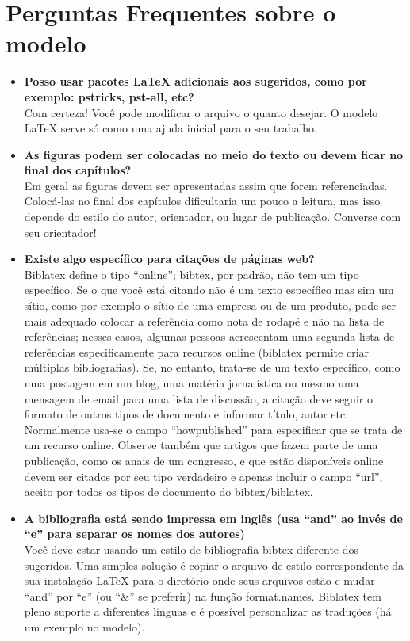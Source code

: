 \section{Perguntas Frequentes sobre o modelo}

\begin{itemize}

\item \textbf{Posso usar pacotes \LaTeX{} adicionais aos sugeridos, como por exemplo: pstricks, pst-all, etc?}\\
Com certeza! Você pode modificar o arquivo o quanto desejar. O modelo \LaTeX{} serve só como uma ajuda inicial para o seu trabalho.

\item \textbf{As figuras podem ser colocadas no meio do texto ou devem ficar no final dos capítulos?}\\
Em geral as figuras devem ser apresentadas assim que forem referenciadas. Colocá-las no final dos capítulos dificultaria um pouco a leitura, mas isso depende do estilo do autor, orientador, ou lugar de publicação. Converse com seu orientador!

\item \textbf{Existe algo específico para citações de páginas web?}\\
Biblatex define o tipo ``online''; bibtex, por padrão, não tem um tipo específico. Se o que você está citando não é um texto específico mas sim um sítio, como por exemplo o sítio de uma empresa ou de um produto, pode ser mais adequado colocar a referência como nota de rodapé e não na lista de referências; nesses casos, algumas pessoas acrescentam uma segunda lista de referências especificamente para recursos online (biblatex  permite criar múltiplas bibliografias). Se, no entanto, trata-se de um texto específico, como uma postagem em um blog, uma matéria jornalística ou mesmo uma mensagem de email para uma lista de discussão, a citação deve seguir o formato de outros tipos de documento e informar título, autor etc. Normalmente usa-se o campo ``howpublished'' para especificar que se trata de um recurso online. Observe também que artigos que fazem parte de uma publicação, como os anais de um congresso, e que estão disponíveis online devem ser citados por seu tipo verdadeiro e apenas incluir o campo ``url'', aceito por todos os tipos de documento do bibtex/biblatex.

\item \textbf{A bibliografia está sendo impressa em inglês (usa ``and'' ao invés de ``e'' para separar os nomes dos autores)}\\
Você deve estar usando um estilo de bibliografia bibtex diferente dos sugeridos. Uma simples solução é copiar o arquivo de estilo correspondente da sua instalação \LaTeX{} para o diretório onde seus arquivos estão e mudar ``and'' por ``e'' (ou ``\&'' se preferir) na função format.names. Biblatex tem pleno suporte a diferentes línguas e é possível personalizar as traduções (há um exemplo no modelo).


\end{itemize}
